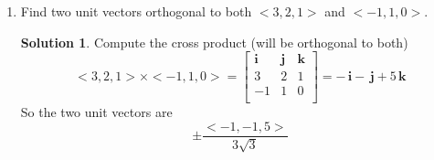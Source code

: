\documentclass[]{book}
\theoremstyle{definition}
\newtheorem*{soln}{Solution}
\begin{document}
\begin{enumerate}
\item	Find two unit vectors orthogonal to both $<3,2,1>$ and $<-1,1,0>$.
\begin{soln}
    Compute the cross product (will be orthogonal to both)
    $$<3,2,1> \times <-1,1,0> = \begin{bmatrix}
        \mathbf{i} & \mathbf{j} & \mathbf{k} \\
        3 & 2 & 1 \\
        -1 & 1 & 0 \\
    \end{bmatrix} = -\,\mathbf{i}-\,\mathbf{j}+5\,\mathbf{k}$$ \newline
    So the two unit vectors are $$\pm \frac{<-1, -1, 5>}{3\sqrt{3}}$$
\end{soln}
\end{enumerate}

\newpage
\end{document}
